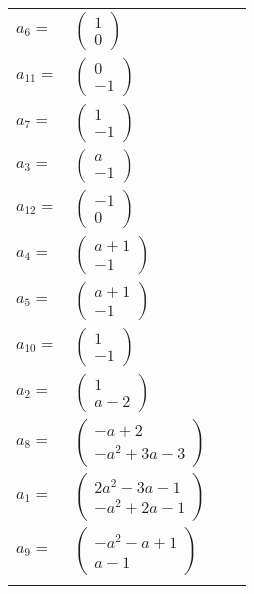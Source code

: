 \documentclass[1p]{elsarticle_modified}
\theoremstyle{definition}
\begin{document}
\begin{tabular}{m{7pt} m{180pt} m{7pt} m{180pt} }
\flushright $a_{6}=$&$\begin{pmatrix}1\\0\end{pmatrix}$ \\
\flushright $a_{11}=$&$\begin{pmatrix}0\\-1\end{pmatrix}$ \\
\flushright $a_{7}=$&$\begin{pmatrix}1\\-1\end{pmatrix}$ \\
\flushright $a_{3}=$&$\begin{pmatrix}a\\-1\end{pmatrix}$ \\
\flushright $a_{12}=$&$\begin{pmatrix}-1\\0\end{pmatrix}$ \\
\flushright $a_{4}=$&$\begin{pmatrix}a+1\\-1\end{pmatrix}$ \\
\flushright $a_{5}=$&$\begin{pmatrix}a+1\\-1\end{pmatrix}$ \\
\flushright $a_{10}=$&$\begin{pmatrix}1\\-1\end{pmatrix}$ \\
\flushright $a_{2}=$&$\begin{pmatrix}1\\a-2\end{pmatrix}$ \\
\flushright $a_{8}=$&$\begin{pmatrix}- a+2\\- a^2+3 a-3\end{pmatrix}$ \\
\flushright $a_{1}=$&$\begin{pmatrix}2 a^2-3 a-1\\- a^2+2 a-1\end{pmatrix}$ \\
\flushright $a_{9}=$&$\begin{pmatrix}- a^2- a+1\\a-1\end{pmatrix}$\\&\end{tabular}
\end{document}
